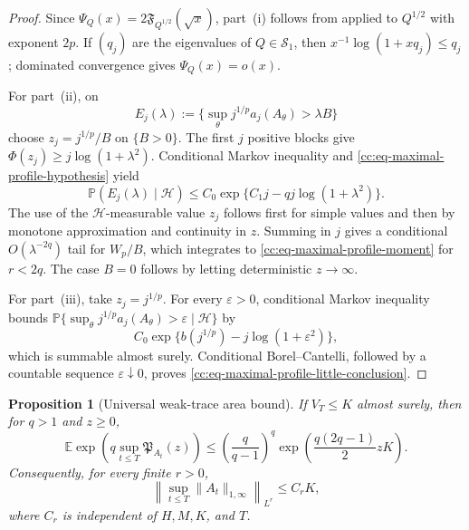 \documentclass[10pt,reqno]{amsart}
\theoremstyle{plain}
\newtheorem{proposition}[theorem]{Proposition}
\theoremstyle{definition}
\theoremstyle{remark}
\begin{document}
\begin{proof}
Since
\(
 \Psi_Q(x)=2\mathfrak F_{Q^{1/2}}(\sqrt{x})
\), part~\textup{(i)} follows from
 applied to \(Q^{1/2}\) with exponent
\(2p\).  If \((q_j)\) are the eigenvalues of \(Q\in\mathcal S_1\), then
\(x^{-1}\log(1+xq_j)\leq q_j\); dominated convergence gives
\(\Psi_Q(x)=o(x)\).

For part~\textup{(ii)}, on
\[
 E_j(\lambda):=
 \{\sup_\theta j^{1/p}a_j(A_\theta)>\lambda B\}
\]
choose \(z_j=j^{1/p}/B\) on \(\{B>0\}\).  The first \(j\) positive
blocks give
\(
 \Phi(z_j)\geq j\log(1+\lambda^2)
\).
Conditional Markov inequality and
\eqref{cc:eq-maximal-profile-hypothesis} yield
\[
 \mathbb P(E_j(\lambda)\mid\mathcal H)
 \leq C_0\exp\{C_1j-qj\log(1+\lambda^2)\}.
\]
The use of the \(\mathcal H\)-measurable value \(z_j\) follows first for
simple values and then by monotone approximation and continuity in \(z\).
Summing in \(j\) gives a conditional
\(O(\lambda^{-2q})\) tail for \(W_p/B\), which integrates to
\eqref{cc:eq-maximal-profile-moment} for \(r<2q\).  The case \(B=0\)
follows by letting deterministic \(z\to\infty\).

For part~\textup{(iii)}, take \(z_j=j^{1/p}\).  For every
\(\varepsilon>0\), conditional Markov inequality bounds
\(
 \mathbb P\{\sup_\theta j^{1/p}a_j(A_\theta)>\varepsilon
 \mid\mathcal H\}
\)
by
\[
 C_0\exp\{b(j^{1/p})-j\log(1+\varepsilon^2)\},
\]
which is summable almost surely.  Conditional Borel--Cantelli, followed by
a countable sequence \(\varepsilon\downarrow0\), proves
\eqref{cc:eq-maximal-profile-little-conclusion}.
\end{proof}

\begin{proposition}[Universal weak-trace area bound]
\label{cc:prop-universal-critical-area-bound}
If \(V_T\leq K\) almost surely, then for \(q>1\) and \(z\geq0\),
\begin{equation}
 \mathbb E\exp\!\left(q\sup_{t\leq T}\mathfrak P_{A_t}(z)\right)
 \leq\left(\frac q{q-1}\right)^q
 \exp\!\left(\frac{q(2q-1)}2zK\right).
 \label{cc:eq-critical-profile-maximal}
\end{equation}
Consequently, for every finite \(r>0\),
\begin{equation}
 \left\|\sup_{t\leq T}\|A_t\|_{1,\infty}\right\|_{L^r}
 \leq C_rK,
 \label{cc:eq-universal-weak-area-bound}
\end{equation}
where \(C_r\) is independent of \(H,M,K\), and \(T\).
\end{proposition}
\end{document}
